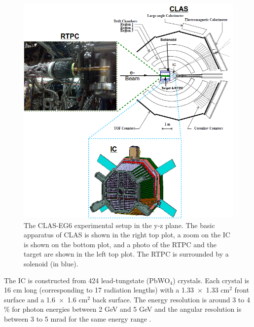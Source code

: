 \begin{figure}[tp]
\centering
\includegraphics[scale=0.54]{fig/clas_rtpc_3.png}
\caption{The CLAS-EG6 experimental setup in the y-z plane. The basic apparatus of CLAS is shown in the right top plot, a zoom on the IC is shown on the bottom plot, and a photo of the RTPC and the target are shown in the left top plot. The RTPC is surrounded by a solenoid (in blue).} 
\label{fig:CLAS_RTPC_2}
\end{figure} 

The IC is constructed from 424 lead-tungstate (PbWO$_{4}$) crystals. Each 
crystal is 16 cm long (corresponding to 17 radiation lengths) with a 
1.33~$\times$~1.33 cm$^2$ front surface and a 1.6~$\times$~1.6 cm$^2$ back 
surface. The energy resolution is around 3 to 4$\%$ for photon energies between 
2 GeV and 5 GeV and the angular resolution is between 3 to 5 mrad for the same 
energy range \cite{Hyon-suk}.


